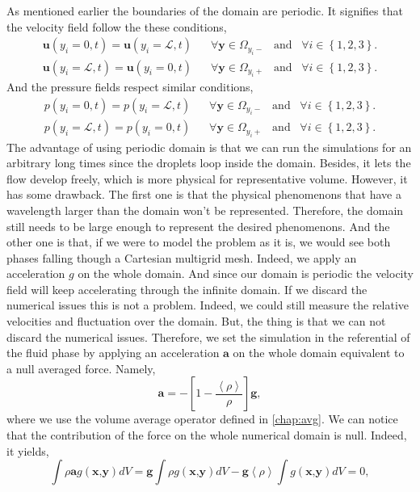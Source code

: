 As mentioned earlier  the boundaries of the domain are periodic. 
It signifies that the velocity field follow the these conditions,
\begin{align}
    \bm{u}(y_i = 0,t) = \bm{u}(y_i = \mathcal{L},t) \;\;\; &\forall \bm{y} \in \Omega_{y_i-} \;\;\;\text{and}\;\;\; \forall i \in \left\{1,2,3\right\}.\\
    \bm{u}(y_i = \mathcal{L},t) = \bm{u}(y_i = 0,t) \;\;\; & \forall \bm{y} \in \Omega_{y_i+} \;\;\;\text{and}\;\;\; \forall i \in \left\{1,2,3\right\}.
\end{align}
And the pressure fields respect similar conditions, 
\begin{align}
    p(y_i = 0,t) = p(y_i = \mathcal{L},t) \;\;\; &\forall \bm{y} \in \Omega_{y_i-} \;\;\;\text{and}\;\;\; \forall i \in \left\{1,2,3\right\}.\\
    p(y_i = \mathcal{L},t) = p(y_i = 0,t) \;\;\; & \forall \bm{y} \in \Omega_{y_i+} \;\;\;\text{and}\;\;\; \forall i \in \left\{1,2,3\right\}.
\end{align}
The advantage of using periodic domain is that we can run the simulations for an arbitrary long times since the droplets loop inside the domain.
Besides, it lets the flow develop freely, which is more physical for representative volume. 
However, it has some drawback.
The first  one is that the physical phenomenons that have a wavelength larger than the domain won't be represented. 
Therefore, the domain still needs to be large enough to represent the desired phenomenons.
And the other one is that, if we were to model the problem as it is, we would see both phases falling though a Cartesian multigrid mesh. 
Indeed, we apply an acceleration $g$ on the whole domain. 
And since our domain is periodic the velocity field will keep accelerating through the infinite domain.
If we discard the numerical issues this is not a problem.
Indeed, we could still measure the relative velocities and fluctuation over the domain. 
But, the thing is that we can not discard the numerical issues. 
Therefore, we set the simulation in the referential of the fluid phase by applying an acceleration $\bm{a}$ on the whole domain equivalent to a null averaged force.
Namely, 
\begin{equation}
    \textbf{a} = - \left[1-\frac{\left<\rho\right>}{\rho}\right]\textbf{g},
\end{equation}
where we use the volume average operator defined in \ref{chap:avg}.
We can notice that the contribution of the force on the whole numerical domain is null.
Indeed, it yields, 
\begin{equation}
   \int \rho\textbf{a} g(\textbf{x,y}) dV 
    = \textbf{g}\int \rho g(\textbf{x,y}) dV -\textbf{g}\left<\rho\right>\int g(\textbf{x,y}) dV 
    =0,
\end{equation}
